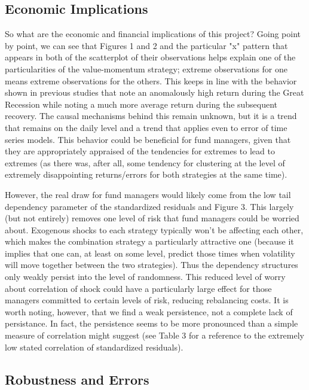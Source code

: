 \documentclass[12pt,letterpaper]{memoir}
\begin{document}
\subsection*{Economic Implications}
So what are the economic and financial implications of this project? Going point by point, we can see that Figures 1 and 2 and the particular "x" pattern that appears in both of the scatterplot of their observations helps explain one of the particularities of the value-momentum strategy; extreme observations for one means extreme observations for the others. This keeps in line with the behavior shown in previous studies that note an anomalously high return during the Great Recession while noting a much more average return during the subsequent recovery. The causal mechanisms behind this remain unknown, but it is a trend that remains on the daily level and a trend that applies even to error of time series models. This behavior could be beneficial for fund managers, given that they are appropriately appraised of the tendencies for extremes to lead to extremes (as there was, after all, some tendency for clustering at the level of extremely disappointing returns/errors for both strategies at the same time).

However, the real draw for fund managers would likely come from the low tail dependency parameter of the standardized residuals and Figure 3. This largely (but not entirely) removes one level of risk that fund managers could be worried about. Exogenous shocks to each strategy typically won't be affecting each other, which makes the combination strategy a particularly attractive one (because it implies that one can, at least on some level, predict those times when volatility will move together between the two strategies). Thus the dependency structures only weakly persist into the level of randomness. This reduced level of worry about correlation of shock could have a particularly large effect for those managers committed to certain levels of risk, reducing rebalancing costs. It is worth noting, however, that we find a weak persistence, not a complete lack of persistance. In fact, the persistence seems to be more pronounced than a simple measure of correlation might suggest (see Table 3 for a reference to the extremely low stated correlation of standardized residuals).
\subsection*{Robustness and Errors}
\newpage
\end{document}
